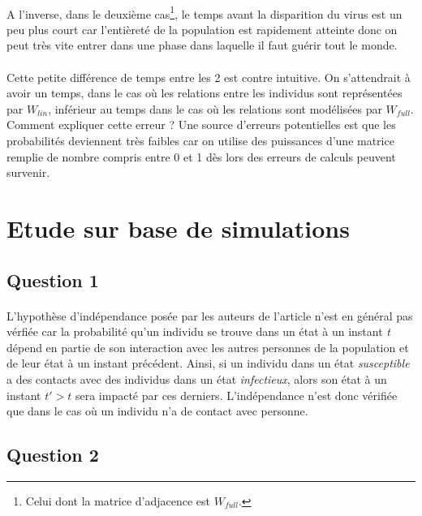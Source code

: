 \documentclass[a4paper, 12pt, oneside]{article}
\begin{document}
\paragraph{}A l'inverse, dans le deuxième cas\footnote{Celui dont la matrice d'adjacence est $W_{full}$.}, le temps avant la disparition du virus est un peu plus court car l'entièreté de la population est rapidement atteinte donc on peut très vite entrer dans une phase dans laquelle il faut guérir tout le monde.
\paragraph{}Cette petite différence de temps entre les 2 est contre intuitive. On s'attendrait à avoir un temps, dans le cas où les relations entre les individus sont représentées par $W_{lin}$, inférieur au temps dans le cas où les relations sont modélisées par $W_{full}$.\\
Comment expliquer cette erreur ? Une source d'erreurs potentielles est que les probabilités deviennent très faibles car on utilise des puissances d'une matrice remplie de nombre compris entre 0 et 1 dès lors des erreurs de calculs peuvent survenir.

\section{Etude sur base de simulations}

\subsection{Question 1}

\paragraph{}L'hypothèse d'indépendance posée par les auteurs de l'article n'est en général pas vérfiée car la probabilité qu'un individu se trouve dans un état à un instant \textit{t} dépend en partie de son interaction avec les autres personnes de la population et de leur état à un instant précédent. Ainsi, si un individu dans un état \textit{susceptible} a des contacts avec des individus dans un état \textit{infectieux}, alors son état à un instant $t' > t$ sera impacté par ces derniers. L'indépendance n'est donc vérifiée que dans le cas où un individu n'a de contact avec personne.

\subsection{Question 2}
\end{document}
